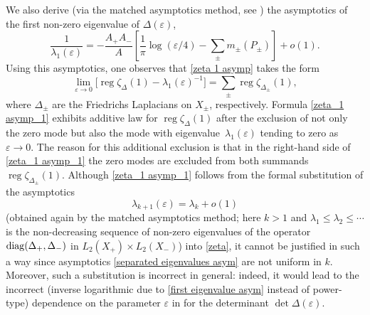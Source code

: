\documentclass[pdftex]{sigma}
\numberwithin{equation}{section}
\theoremstyle{definition}
\begin{document}
We also derive (via the matched asymptotics method, see \cite[Chapters 2 and 6]{MNP}) the asymptotics of the first non-zero eigenvalue of $\Delta(\varepsilon)$,
\begin{equation}
\label{first eigenvalue asym}
\frac{1}{\lambda_1(\varepsilon)}=-\frac{A_+A_-}{A}\left[\frac{1}{\pi}\log (\varepsilon/4)-\sum_\pm m_\pm(P_\pm)\right]+o(1).
\end{equation}
Using this asymptotics, one observes that \eqref{zeta 1 asymp} takes the form
\begin{equation}
\label{zeta_1 asymp_1}
\lim_{\varepsilon\to 0}\bigl[\operatorname{reg} \zeta_{\Delta}(1)-\lambda_1(\varepsilon)^{-1}\bigr]=\sum_{\pm}\operatorname{reg} \zeta_{\Delta_{\pm}}(1),
\end{equation}
where $\Delta_\pm$ are the Friedrichs Laplacians on $X_\pm$, respectively. Formula \eqref{zeta_1 asymp_1} exhibits additive law for $\operatorname{reg} \zeta_{\Delta}(1)$ after the exclusion of not only the zero mode but also the mode with eigenvalue~$\lambda_1(\varepsilon)$ tending to zero as $\varepsilon\to 0$. The reason for this additional exclusion is that in the right-hand side of \eqref{zeta_1 asymp_1} the zero modes are excluded from both summands $\operatorname{reg} \zeta_{\Delta_{\pm}}(1)$. Although \eqref{zeta_1 asymp_1} follows from the formal substitution of the asymptotics
\begin{equation}
\label{separated eigenvalues asym}
\lambda_{k+1}(\varepsilon)=\lambda_{k}+o(1)
\end{equation}
(obtained again by the matched asymptotics method; here $k>1$ and $\lambda_1\le\lambda_2\le\cdots$ is the non-decreasing sequence of non-zero eigenvalues of the operator ${\rm diag}(\Delta_+,\Delta_-)$ in $L_2(X_+)\times L_2(X_-)$) into \eqref{zeta}, it cannot be justified in such a way since asymptotics \eqref{separated eigenvalues asym} are not uniform in $k$. Moreover, such a substitution is incorrect in general: indeed, it would lead to the incorrect (inverse logarithmic due to \eqref{first eigenvalue asym} instead of power-type) dependence on the parameter $\varepsilon$ in \cite[formula (3.15)]{KokTAMS} for the determinant $\det \Delta(\varepsilon)$.
\end{document}
